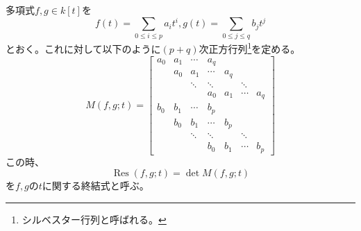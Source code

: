 \documentclass[a4]{article}
\newcommand{\Res}{\operatorname{Res}}
\begin{document}
            \begin{Def}
                多項式$f, g \in k[t]$を
                \[ f(t)=\sum_{0 \leq i \leq p}{a_{i}t^{i}}, g(t)=\sum_{0 \leq j \leq q}{b_{j}t^{j}} \]
                とおく。これに対して以下のように$(p+q)$次正方行列\footnote{シルベスター行列と呼ばれる。}を定める。
                \[
                    M(f,g; t)=
                    \begin{bmatrix}
                        a_0&    a_1&    \cdots&     a_q \\
                        {}&     a_0&    a_1&        \cdots&     a_q \\
                        {}&     {}&     \ddots&     \ddots&     {}&     \ddots& \\
                        {}&     {}&     {}&         a_0&        a_1&    \cdots&    a_q \\
                        b_0&    b_1&    \cdots&     b_p \\
                        {}&     b_0&    b_1&        \cdots&     b_p \\
                        {}&     {}&     \ddots&     \ddots&     {}&     \ddots& \\
                        {}&     {}&     {}&         b_0&        b_1&    \cdots&    b_p
                    \end{bmatrix}
                \]
                この時、
                \[ \Res(f,g; t)=\det M(f,g; t) \]
                を$f,g$の$t$に関する終結式と呼ぶ。
            \end{Def}
\end{document}

